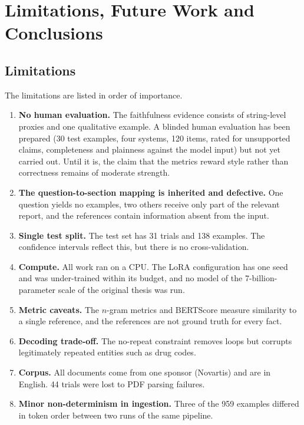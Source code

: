 
\chapter{Limitations, Future Work and Conclusions} %
\label{conclusion}

\section{Limitations}
\label{sec:limitations}

The limitations are listed in order of importance.

\begin{enumerate}
    \item \textbf{No human evaluation.} The faithfulness evidence consists of string-level proxies and one qualitative example. A blinded human evaluation has been prepared (30 test examples, four systems, 120 items, rated for unsupported claims, completeness and plainness against the model input) but not yet carried out. Until it is, the claim that the metrics reward style rather than correctness remains of moderate strength.
    \item \textbf{The question-to-section mapping is inherited and defective.} One question yields no examples, two others receive only part of the relevant report, and the references contain information absent from the input.
    \item \textbf{Single test split.} The test set has 31 trials and 138 examples. The confidence intervals reflect this, but there is no cross-validation.
    \item \textbf{Compute.} All work ran on a CPU. The LoRA configuration has one seed and was under-trained within its budget, and no model of the 7-billion-parameter scale of the original thesis was run.
    \item \textbf{Metric caveats.} The $n$-gram metrics and BERTScore measure similarity to a single reference, and the references are not ground truth for every fact.
    \item \textbf{Decoding trade-off.} The no-repeat constraint removes loops but corrupts legitimately repeated entities such as drug codes.
    \item \textbf{Corpus.} All documents come from one sponsor (Novartis) and are in English. 44 trials were lost to PDF parsing failures.
    \item \textbf{Minor non-determinism in ingestion.} Three of the 959 examples differed in token order between two runs of the same pipeline.
\end{enumerate}

